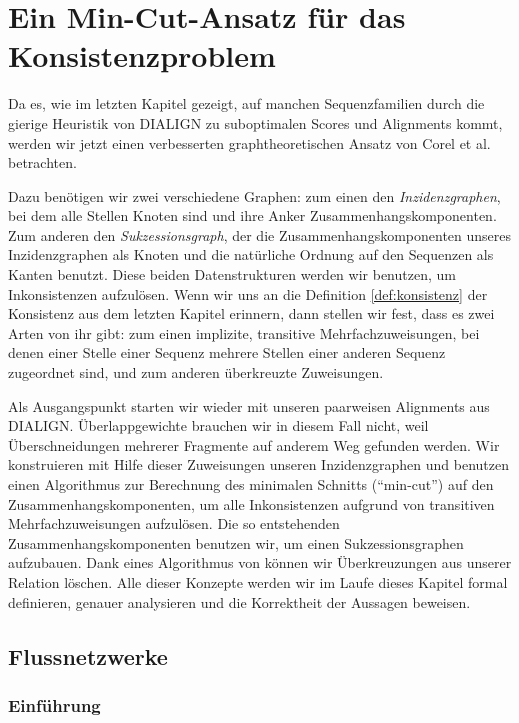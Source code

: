 \chapter{Ein Min-Cut-Ansatz für das Konsistenzproblem}
\label{ch:min-cut}
Da es, wie im letzten Kapitel gezeigt, auf manchen Sequenzfamilien durch die gierige Heuristik von DIALIGN zu suboptimalen Scores und Alignments kommt, werden wir jetzt einen verbesserten graphtheoretischen Ansatz von Corel et al. betrachten\cite{cpm10}.

Dazu benötigen wir zwei verschiedene Graphen: zum einen den \emph{Inzidenzgraphen}, bei dem alle Stellen Knoten sind und ihre Anker Zusammenhangskomponenten. Zum anderen den \emph{Sukzessionsgraph}, der die Zusammenhangskomponenten unseres Inzidenzgraphen als Knoten und die natürliche Ordnung auf den Sequenzen als Kanten benutzt. Diese beiden Datenstrukturen werden wir benutzen, um Inkonsistenzen aufzulösen. Wenn wir uns an die Definition \ref{def:konsistenz} der Konsistenz aus dem letzten Kapitel erinnern, dann stellen wir fest, dass es zwei Arten von ihr gibt: zum einen implizite, transitive Mehrfachzuweisungen, bei denen einer Stelle einer Sequenz mehrere Stellen einer anderen Sequenz zugeordnet sind, und zum anderen überkreuzte Zuweisungen.

Als Ausgangspunkt starten wir wieder mit unseren paarweisen Alignments aus DIALIGN. Überlappgewichte brauchen wir in diesem Fall nicht, weil Überschneidungen mehrerer Fragmente auf anderem Weg gefunden werden. Wir konstruieren mit Hilfe dieser Zuweisungen unseren Inzidenzgraphen und benutzen einen Algorithmus zur Berechnung des minimalen Schnitts (\enquote{min-cut}) auf den Zusammenhangskomponenten, um alle Inkonsistenzen aufgrund von transitiven Mehrfachzuweisungen aufzulösen. Die so entstehenden Zusammenhangskomponenten benutzen wir, um einen Sukzessionsgraphen aufzubauen. Dank eines Algorithmus von \cite{pdc10} können wir Überkreuzungen aus unserer Relation löschen. Alle dieser Konzepte werden wir im Laufe dieses Kapitel formal definieren, genauer analysieren und die Korrektheit der Aussagen beweisen.
 
\section{Flussnetzwerke}

\subsection{Einführung}


